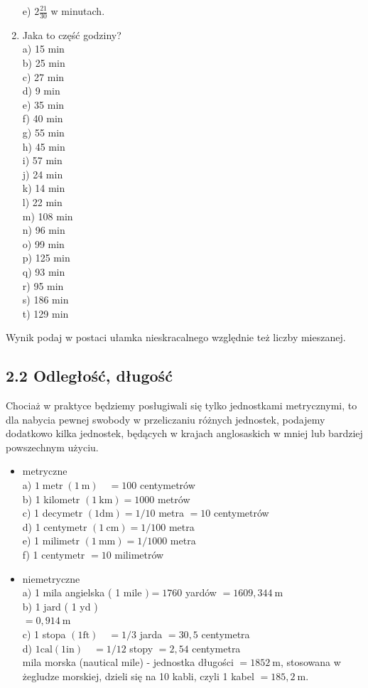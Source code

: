 \documentclass[10pt]{article}
\begin{document}
\begin{enumerate}
e) \(2 \frac{21}{30}\) w minutach.
  \item Jaka to część godziny?\\
a) 15 min\\
b) 25 min\\
c) 27 min\\
d) 9 min\\
e) 35 min\\
f) 40 min\\
g) 55 min\\
h) 45 min\\
i) 57 min\\
j) 24 min\\
k) 14 min\\
l) 22 min\\
m) 108 min\\
n) 96 min\\
o) 99 min\\
p) 125 min\\
q) 93 min\\
r) 95 min\\
s) 186 min\\
t) 129 min
\end{enumerate}

Wynik podaj w postaci ułamka nieskracalnego względnie też liczby mieszanej.

\subsection*{2.2 Odległość, długość}
Chociaż w praktyce będziemy posługiwali się tylko jednostkami metrycznymi, to dla nabycia pewnej swobody w przeliczaniu różnych jednostek, podajemy dodatkowo kilka jednostek, będących w krajach anglosaskich w mniej lub bardziej powszechnym użyciu.

\begin{itemize}
  \item metryczne\\
a) \(1 \operatorname{metr}(1 \mathrm{~m}) \quad=100\) centymetrów\\
b) 1 kilometr \((1 \mathrm{~km})=1000\) metrów\\
c) 1 decymetr \((1 \mathrm{dm})=1 / 10\) metra \(=10\) centymetrów\\
d) 1 centymetr \((1 \mathrm{~cm})=1 / 100\) metra\\
e) 1 milimetr \((1 \mathrm{~mm})=1 / 1000\) metra\\
f) 1 centymetr \(=10\) milimetrów
  \item niemetryczne\\
a) 1 mila angielska ( 1 mile \()=1760\) yardów \(=1609,344 \mathrm{~m}\)\\
b) 1 jard ( 1 yd )\\
\(=0,914 \mathrm{~m}\)\\
c) 1 stopa \((1 \mathrm{ft}) \quad=1 / 3\) jarda \(=30,5\) centymetra\\
d) \(1 \mathrm{cal}(1 \mathrm{in}) \quad=1 / 12\) stopy \(=2,54\) centymetra\\
mila morska (nautical mile) - jednostka długości \(=1852 \mathrm{~m}\), stosowana w żegludze morskiej, dzieli się na 10 kabli, czyli 1 kabel \(=185,2 \mathrm{~m}\).
\end{itemize}
\end{document}
